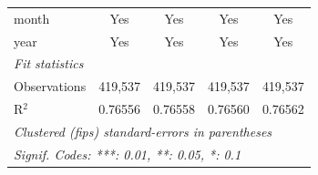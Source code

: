 \documentclass{article}
\begin{document}
\begin{appendices}
\begin{table}[htbp]
\begin{tabular}{lcccc}
      month             & Yes             & Yes             & Yes             & Yes\\  
      year              & Yes             & Yes             & Yes             & Yes\\  
      \midrule
      \emph{Fit statistics}\\
      Observations      & 419,537         & 419,537         & 419,537         & 419,537\\  
      R$^2$             & 0.76556         & 0.76558         & 0.76560         & 0.76562\\  
      \midrule \midrule
      \multicolumn{5}{l}{\emph{Clustered (fips) standard-errors in parentheses}}\\
      \multicolumn{5}{l}{\emph{Signif. Codes: ***: 0.01, **: 0.05, *: 0.1}}\\
   \end{tabular}
\end{table}




\end{appendices}
\end{document}
